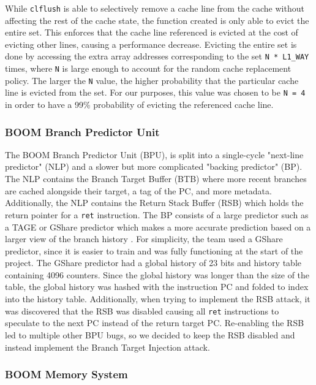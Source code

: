 While {\tt clflush} is able to selectively remove a cache line from the cache without 
affecting the rest of the cache state, the function created is only able to evict the entire set.
This enforces that the cache line referenced is evicted at the cost of evicting other lines, causing a performance
decrease. Evicting the entire set is done by accessing the extra array addresses corresponding to the set 
{\tt N * L1\_WAY} times, where {\tt N} is large enough to account for the random cache replacement policy. The larger
the {\tt N} value, the higher probability that the particular cache line is evicted from the set. For our purposes, this value
was chosen to be {\tt N = 4} in order to have a 99\% probability of evicting the referenced cache line.

\subsubsection{BOOM Branch Predictor Unit}


The BOOM Branch Predictor Unit (BPU), is split into a single-cycle "next-line predictor" (NLP) and a
slower but more complicated "backing predictor" (BP). The NLP contains the Branch Target Buffer (BTB) 
where more recent branches are cached alongside their target, a tag of the PC, and more metadata. Additionally,
the NLP contains the Return Stack Buffer (RSB) which holds the return pointer for a {\tt ret} instruction. The BP
consists of a large predictor such as a TAGE or GShare predictor which makes a more accurate prediction based on
a larger view of the branch history \cite{b47}. For simplicity, the team used a GShare predictor, since it is 
easier to train and was fully functioning at the start of the project. The GShare predictor had a global history of 23 bits and history table containing 4096 
counters. Since the global history was longer than the size of the table, the global history was hashed with the 
instruction PC and folded to index into the history table. Additionally, when trying to
implement the RSB attack, it was discovered that the RSB was disabled causing all {\tt ret} instructions
to speculate to the next PC instead of the return target PC. Re-enabling the RSB led to multiple other BPU bugs,
so we decided to keep the RSB disabled and instead implement the Branch Target Injection attack.

\subsubsection{BOOM Memory System}

